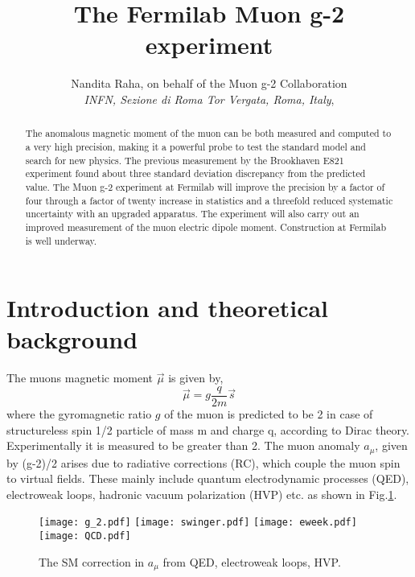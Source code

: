 \documentclass{article}
\begin{document}
%
\title{\textbf{The Fermilab Muon g-2 experiment}}
\author{
Nandita Raha, on behalf of the Muon g-2 Collaboration     \\
{\em INFN, Sezione di Roma Tor Vergata, Roma, Italy}, 
\\
}
\maketitle
\baselineskip=11.6pt
\begin{abstract}
The anomalous magnetic moment of the muon can be both measured and computed
to a very high precision, making it a powerful probe to test the standard model and
search for new physics. The previous measurement by the Brookhaven
E821 experiment found about three standard deviation discrepancy from the predicted value.
The Muon g-2 experiment at Fermilab will improve the precision by a factor of four
through a factor of twenty increase in statistics and a threefold reduced systematic uncertainty
with an upgraded apparatus. The experiment will also carry out an improved measurement
of the muon electric dipole moment. Construction at Fermilab is well underway. 
\end{abstract}
%
\baselineskip=14pt
%
\section{Introduction and theoretical background}
The muons magnetic moment $\vec{\mu}$ is given by, 
\begin{equation}
\vec{\mu} = g \frac{q} {2 m}\vec{s}
\end{equation}
where the gyromagnetic ratio $g$ of the muon is predicted to be 2 in case of
structureless spin 1/2 particle of mass m and charge q, according to Dirac theory.
Experimentally it is measured to be greater than 2. The muon anomaly 
$a_{\mu}$, given by (g-2)/2 arises due to radiative corrections (RC), which couple the
muon spin to virtual fields. These mainly include quantum electrodynamic processes
(QED), electroweak loops, hadronic vacuum polarization (HVP) etc. as shown in
Fig.\ref{fig1}.
\begin{center}
\begin{figure}[h]
\vspace{0.2 cm}
\hspace{0.5 cm}
\texttt{[image: g\_2.pdf]}
\texttt{[image: swinger.pdf]}
\vspace{-0.2 cm}
\texttt{[image: eweek.pdf]}
\texttt{[image: QCD.pdf]}
\caption{\label{fig1}The SM correction in $a_{\mu}$ from
QED, electroweak loops, HVP. }
\end{figure}
\end{center}
\end{document}
